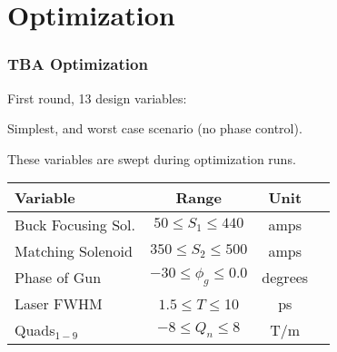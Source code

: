 \documentclass[professionalfonts,t]{beamer}
\begin{document}
\section{Optimization}
\begin{frame}
\frametitle{TBA Optimization}
\vspace{-0.75em}
\begin{tikzpicture}[scale=\textwidth/26cm, text=black]

\end{tikzpicture}

\vspace{-1em}
First round, 13 design variables:

Simplest, and worst case scenario (no phase control).

These variables are swept during optimization runs.
\begin{table}[hbt] 
\centering
\begin{tabular}{ l *{3}{c}}
	\toprule
	\textbf{Variable} & \textbf{Range} & \textbf{Unit} \\
	\midrule
	Buck Focusing Sol. &  $ 50 \le S_1 \le 440$ & amps \\
	Matching Solenoid & $ 350 \le S_2 \le 500$  & amps \\
	Phase of Gun & $-30 \le \phi_g \le 0.0$  & degrees \\
	Laser FWHM & $1.5 \le T \le $10  & ps \\
	Quads$_{1-9}$ & $-8 \le Q_n \le 8$  & T/m \\
	\bottomrule	
\end{tabular}


\end{table}
\end{frame}
\end{document}
